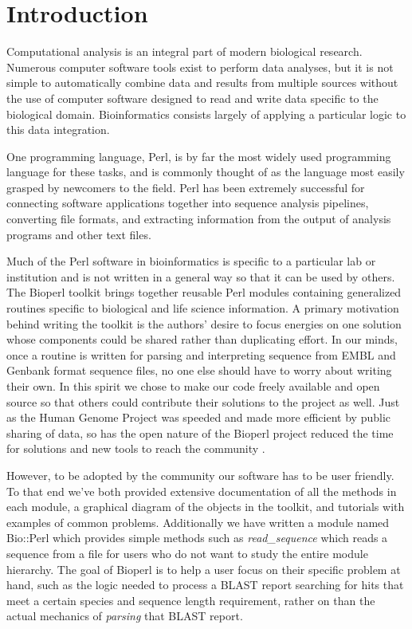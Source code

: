 \documentclass[12pt]{article}
\begin{document}
\section{Introduction}

Computational analysis is an integral part of modern biological
research.  Numerous computer software tools exist to perform 
data analyses, but it is not simple to automatically
combine data and results from multiple sources without the use of
computer software designed to read and write data specific to the
biological domain.  Bioinformatics consists largely of applying a
particular logic to this data integration.

One programming language, Perl, is by far the most widely used
programming language for these tasks, and is commonly thought of as
the language most easily grasped by newcomers to the field.  Perl has
been extremely successful for connecting software applications together into
sequence analysis pipelines, converting file formats, and extracting
information from the output of analysis programs and other text files.

Much of the Perl software in bioinformatics is specific to a
particular lab or institution and is not written in a general way so
that it can be used by others.  The Bioperl toolkit brings together reusable
Perl modules containing generalized routines specific to biological
and life science information.  A primary
motivation behind writing the toolkit is the authors' desire to focus
energies on one solution whose components could be shared rather
than duplicating effort.  In our minds, once a routine is written for
parsing and interpreting sequence from EMBL and Genbank format sequence files, no one else should have to worry about writing their own.
In this spirit we chose to make our code freely available and open
source so that others could contribute their solutions to the project
as well.  Just as the Human Genome Project was speeded and made more
efficient by public sharing of data, so has the open nature of the
Bioperl project reduced the time for solutions and new tools to reach the
community \cite{waterston}.

However, to be adopted by the community our software has to be user
friendly.  To that end we've both provided extensive documentation of
all the methods in each module, a graphical diagram of the objects in
the toolkit, and tutorials with examples of common problems.
Additionally we have written a module named Bio::Perl which provides
simple methods such as \textit{read\_sequence} which reads a sequence
from a file for users who do not want to study the entire module
hierarchy.  The goal of Bioperl is to help a user focus on their
specific problem at hand, such as the logic needed to process a BLAST
\cite{blast} report searching for hits that meet a certain species and
sequence length requirement, rather on than the actual mechanics of
\textit{parsing} that BLAST report.
\end{document}
